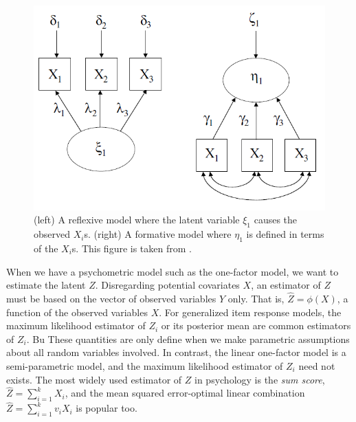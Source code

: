 \begin{figure}
\noindent \begin{centering}
\includegraphics[scale=0.5]{chunks/borsboom}
\par\end{centering}

\caption{\label{fig:dag}(left) A reflexive model where the latent variable $\xi_{1}$ causes the observed $X_{i}$s. (right) A formative model where $\eta_{1}$ is defined in terms of the $X_{i}$s. This figure is taken from \cite[p. 61]{Borsboom2005-iq}.}
\end{figure}

When we have a psychometric model such as the one-factor model, we want to estimate the latent $Z$. Disregarding potential covariates $X$, an estimator of $Z$ must be based on the vector of observed variables $Y$ only. That is, $\hat{Z}=\phi(X)$, a function of the observed variables $X$. For generalized item response models, the maximum likelihood estimator of $Z_{i}$ or its posterior mean are common estimators of $Z_{i}$. Bu These quantities are only define when we make parametric assumptions about all random variables involved. In contrast, the linear one-factor model is a semi-parametric model, and the maximum likelihood estimator of $Z_{i}$ need not exists. The most widely used estimator of $Z$ in psychology is the \emph{sum
score}, $\hat{Z}=\sum_{i=1}^{k}X_{i}$, and the mean squared error-optimal linear combination $\hat{Z}=\sum_{i=1}^{k}v_{i}X_{i}$ is popular too. 

